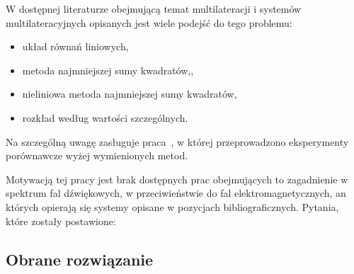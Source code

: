 W dostępnej literaturze obejmującą temat multilateracji i systemów multilateracyjnych opisanych jest wiele podejść do tego problemu:

\begin{itemize}
    \item układ równań liniowych\cite{murphy1995determination},
    \item metoda najmniejszej sumy kwadratów\cite{murphy1995determination},\cite{norrdine2012algebraic},
    \item nieliniowa metoda najmniejszej sumy kwadratów\cite{murphy1995determination},
    \item rozkład według wartości szczególnych\cite{murphy1995determination}.
\end{itemize}
Na szczególną uwagę zasługuje praca~\cite{murphy1995determination}, w której przeprowadzono eksperymenty porównawcze wyżej wymienionych metod.

Motywacją tej pracy jest brak dostępnych prac obejmujących to zagadnienie w spektrum fal dźwiękowych, w przeciwieństwie do fal elektromagnetycznych, an których opierają się systemy opisane w pozycjach bibliograficznych. Pytania, które zostały postawione:

\subsection{Obrane rozwiązanie}

